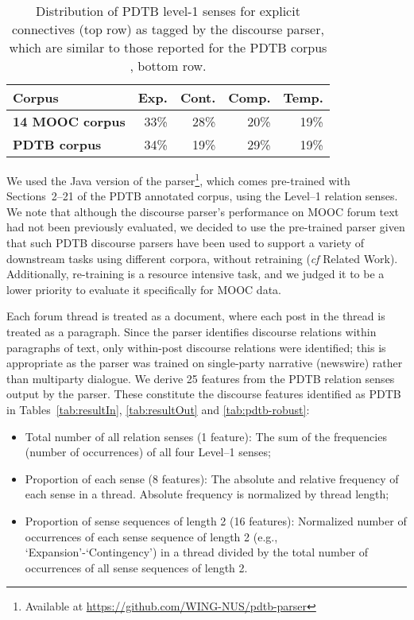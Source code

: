 \documentclass[letterpaper]{article}
\begin{document}
\begin{table}
\centering
\def\arraystretch{1.2}%
\begin{tabular}{|l|r|r|r|r|}
\hline
\bf Corpus&  Exp.& Cont.& Comp. & Temp.\\
\hline
\small
\bf 14 MOOC corpus& 33\%&  28\%& 20\%& 19\%\\
\bf PDTB corpus&  34\%&  19\%& 29\%& 19\%\\
\hline
\end{tabular}
\caption{Distribution of PDTB level-1 senses for explicit connectives (top 
row) as tagged by the discourse parser, which are similar 
to those reported for the PDTB corpus \cite{Prasad2008}, bottom row.}
\label{tab:corpCompare}
\end{table}

We used  the Java version of the parser\footnote{Available at 
\url{https://github.com/WING-NUS/pdtb-parser}}, which comes pre-trained
with Sections~2--21 of the PDTB annotated corpus, using 
the {Level--1} relation senses. 
We note that although the discourse parser's performance on MOOC forum
text had not been previously evaluated, we decided to use the
pre-trained parser given that such PDTB discourse parsers have been
used to support a variety of downstream tasks using different corpora,
without retraining ({\it cf} Related Work). Additionally, re-training
is a resource intensive task, and we judged it to be a lower priority
to evaluate it specifically for MOOC data.

Each forum thread is treated as a document, where each post in the thread 
is treated as a paragraph. Since the parser identifies discourse relations 
within paragraphs of text, only within-post discourse relations 
were identified; this is appropriate as the parser was trained on
single-party narrative (newswire) rather than multiparty dialogue.  
We derive 25 features from the PDTB relation senses output by the parser. 
These constitute the discourse features identified as PDTB in 
Tables~\ref{tab:resultIn}, \ref{tab:resultOut} and \ref{tab:pdtb-robust}:

\begin{itemize}
\item Total number of all relation senses (1 feature): The sum of the 
frequencies (number of occurrences) of all four Level--1 senses;
\item Proportion of each sense (8 features): The absolute and relative 
frequency of each sense in a thread. Absolute frequency 
is normalized by thread length;
\item Proportion of sense sequences of length 2 (16 features): Normalized 
number of occurrences of each sense sequence of length 2 
(e.g., `Expansion'-`Contingency') in a thread divided by the total 
number of occurrences of all sense sequences of length 2.
\end{itemize}
\end{document}
